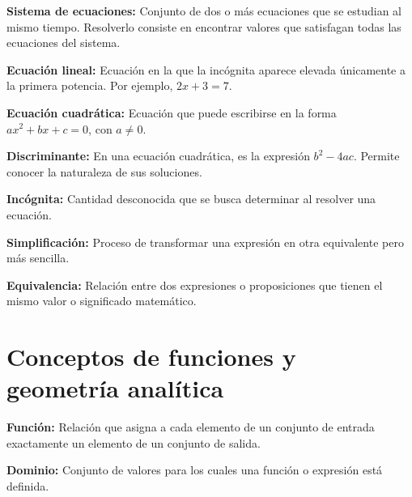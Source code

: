 \documentclass[12pt,final]{report}
\theoremstyle{plain}
\theoremstyle{definition}
\begin{document}
\vspace{0.5em}

\textbf{Sistema de ecuaciones:} Conjunto de dos o más ecuaciones que se estudian al mismo tiempo. Resolverlo consiste en encontrar valores que satisfagan todas las ecuaciones del sistema.

\vspace{0.5em}

\textbf{Ecuación lineal:} Ecuación en la que la incógnita aparece elevada únicamente a la primera potencia. Por ejemplo, $2x+3=7$.

\vspace{0.5em}

\textbf{Ecuación cuadrática:} Ecuación que puede escribirse en la forma $ax^2+bx+c=0$, con $a \neq 0$.

\vspace{0.5em}

\textbf{Discriminante:} En una ecuación cuadrática, es la expresión $b^2-4ac$. Permite conocer la naturaleza de sus soluciones.

\vspace{0.5em}

\textbf{Incógnita:} Cantidad desconocida que se busca determinar al resolver una ecuación.

\vspace{0.5em}

\textbf{Simplificación:} Proceso de transformar una expresión en otra equivalente pero más sencilla.

\vspace{0.5em}

\textbf{Equivalencia:} Relación entre dos expresiones o proposiciones que tienen el mismo valor o significado matemático.

\section*{Conceptos de funciones y geometría analítica}

\vspace{0.5em}

\textbf{Función:} Relación que asigna a cada elemento de un conjunto de entrada exactamente un elemento de un conjunto de salida.

\vspace{0.5em}

\textbf{Dominio:} Conjunto de valores para los cuales una función o expresión está definida.

\vspace{0.5em}
\end{document}

